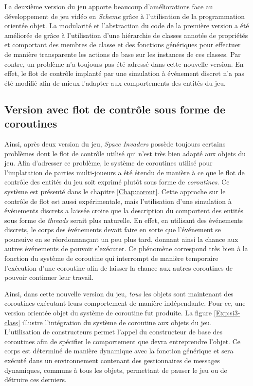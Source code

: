 \documentclass[12pt,twoside,letterpaper,francais]{book}
\newcommand{\si}{{\textit{Space Invaders }}}
\newcommand{\Schemelang}{{\textit{Scheme }}}
\newcommand{\scheme}[1]{\selectlanguage{english}{\tt #1}\selectlanguage{french}}
\begin{document}
La deuxième version du jeu apporte beaucoup d'améliorations face au
développement de jeu vidéo en \Schemelang grâce à l'utilisation de la
programmation orientée objet. La modularité et l'abstraction du code
de la première version a été améliorée de grâce à l'utilisation d'une
hiérarchie de classes annotée de propriétés et comportant des membres
de classe et des fonctions génériques pour effectuer de manière
transparente les actions de base sur les instances de ces classes. Par
contre, un problème n'a toujours pas été adressé dans cette nouvelle
version. En effet, le flot de contrôle implanté par une simulation à
événement discret n'a pas été modifié afin de mieux l'adapter aux
comportements des entités du jeu.


\FloatBarrier
\subsection{Version avec flot de contrôle sous forme de coroutines} \label{Exp:sp3}
Ainsi, après deux version du jeu, \si possède toujours certains
problèmes dont le flot de contrôle utilisé qui n'est très bien adapté
aux objets du jeu. Afin d'adresser ce problème, le système de
coroutines utilisé pour l'implatation de parties multi-joueurs a été
étendu de manière à ce que le flot de contrôle des entités du jeu soit
exprimé plutôt sous forme de \emph{coroutines}. Ce système est
présenté dans le chapitre \ref{Chap:corout}. Cette approche sur le
contrôle de flot est aussi expérimentale, mais l'utilisation d'une
simulation à événements discrets a laissée croire que la description
du comportent des entités sous forme de \textit{threads} serait plus
naturelle. En effet, en utilisant des événements discrets, le corps
des événements devait faire en sorte que l'événement se poursuive en
se réordonnançant un peu plus tard, donnant ainsi la chance aux autres
événements de pouvoir s'exécuter. Ce phénomène correspond très bien à
la fonction \scheme{yield} du système de coroutine qui interrompt de
manière temporaire l'exécution d'une coroutine afin de laisser la
chance aux autres coroutines de pouvoir continuer leur travail.

Ainsi, dans cette nouvelle version du jeu, \emph{tous} les objets sont
maintenant des coroutines exécutant leurs comportement de manière
indépendante. Pour ce, une version orientée objet du système de
coroutine fut produite. La figure \ref{Exp:si3-class} illustre
l'intégration du système de coroutine aux objets du jeu. L'utilisation
de constructeurs permet l'appel du constructeur de base des coroutines
afin de spécifier le comportement que devra entreprendre l'objet. Ce
corps est déterminé de manière dynamique avec la fonction générique
\scheme{behaviour} et sera exécuté dans un environnement contenant des
gestionnaires de messages dynamiques, communs à tous les objets,
permettant de pauser le jeu ou de détruire ces derniers.
\end{document}
